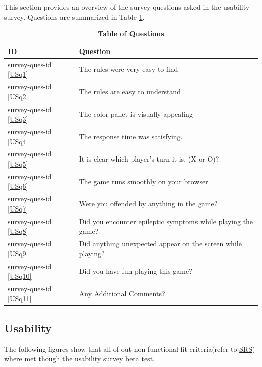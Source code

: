 \documentclass[12pt, titlepage]{article}
\newcommand{\USref}[1]{survey-ques-id \ref{#1}}
\begin{document}
This section provides an overview of the survey questions asked in the usability survey. Questions are summarized in Table \ref{TbQuestionsList}. 

\begin{table}[H]
\caption{\textbf{Table of Questions}} \label{TbQuestionsList}
\begin{tabularx}{\textwidth}{p{3.1cm}X}
\toprule
\textbf{ID} & \textbf{Question} \\
\midrule

\USref{USq1} & The rules were very easy to find \\
\USref{USq2} & The rules are easy to understand \\
\USref{USq3} & The color pallet is visually appealing \\
\USref{USq4} & The response time was satisfying.\\
\USref{USq5} & It is clear which player's turn it is. (X or O)?\\
\USref{USq6} & The game runs smoothly on your browser\\
\USref{USq7} & Were you offended by anything in the game?\\
\USref{USq8} & Did you encounter epileptic symptoms while playing the game?\\
\USref{USq9} & Did anything unexpected appear on the screen while playing?\\
\USref{USq10} & Did you have fun playing this game?\\
\USref{USq11} & Any Additional Comments?\\


\bottomrule
\end{tabularx}
\end{table}

\subsection{Usability}
The following figures show that all of out non functional fit criteria(refer to \href{run:../SRS/SRS.pdf}{SRS}) where met though the usability survey beta test.
\end{document}
